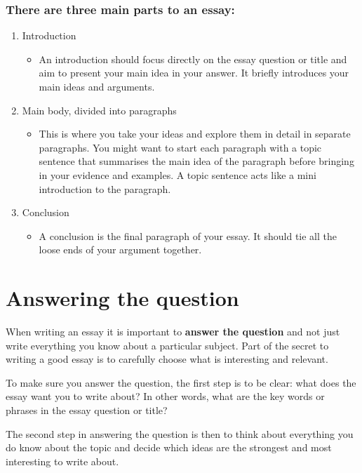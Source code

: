 	\subsubsection{There are three main parts to an essay:}
		\begin{enumerate}
			\item Introduction
				\begin{itemize}
					\item An introduction should focus directly on the essay question or title and aim to present your main idea in your answer. It briefly introduces your main ideas and arguments.
				\end{itemize}
			\item Main body, divided into paragraphs
				\begin{itemize}
					\item This is where you take your ideas and explore them in detail in separate paragraphs. You might want to start each paragraph with a topic sentence that summarises the main idea of the paragraph before bringing in your evidence and examples. A topic sentence acts like a mini introduction to the paragraph.
				\end{itemize}
			\item Conclusion
				\begin{itemize}
					\item A conclusion is the final paragraph of your essay. It should tie all the loose ends of your argument together.
				\end{itemize}
		\end{enumerate}
	
\section{Answering the question}
	When writing an essay it is important to \textbf{answer the question} and not just write everything you know about a particular subject. Part of the secret to writing a good essay is to carefully choose what is interesting and relevant.
	
	To make sure you answer the question, the first step is to be clear: what does the essay want you to write about? In other words, what are the key words or phrases in the essay question or title?
	
	The second step in answering the question is then to think about everything you do know about the topic and decide which ideas are the strongest and most interesting to write about.
	
